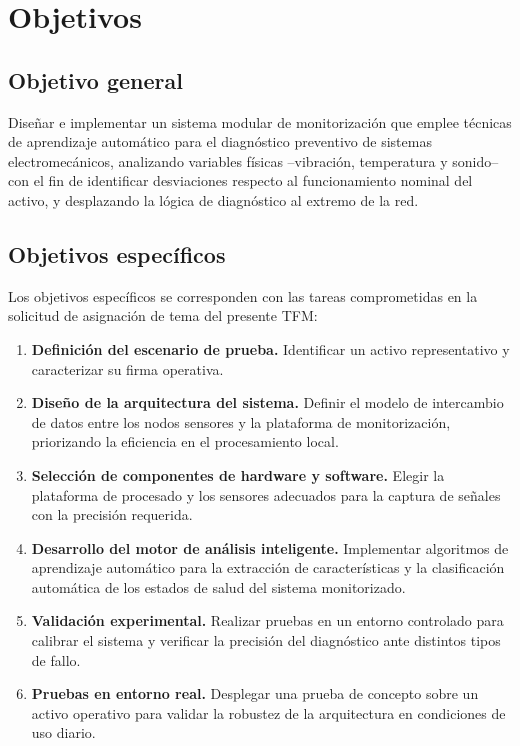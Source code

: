 \chapter{Objetivos}
\label{cap:objetivos}

\section{Objetivo general}

Diseñar e implementar un sistema modular de monitorización que emplee técnicas de
aprendizaje automático para el diagnóstico preventivo de sistemas electromecánicos,
analizando variables físicas --vibración, temperatura y sonido-- con el fin de identificar
desviaciones respecto al funcionamiento nominal del activo, y desplazando la lógica de
diagnóstico al extremo de la red.

\section{Objetivos específicos}

Los objetivos específicos se corresponden con las tareas comprometidas en la solicitud de
asignación de tema del presente TFM:

\begin{enumerate}
    \item \textbf{Definición del escenario de prueba.} Identificar un activo
        representativo y caracterizar su firma operativa.
    \item \textbf{Diseño de la arquitectura del sistema.} Definir el modelo de intercambio
        de datos entre los nodos sensores y la plataforma de monitorización, priorizando la
        eficiencia en el procesamiento local.
    \item \textbf{Selección de componentes de hardware y software.} Elegir la plataforma de
        procesado y los sensores adecuados para la captura de señales con la precisión
        requerida.
    \item \textbf{Desarrollo del motor de análisis inteligente.} Implementar algoritmos de
        aprendizaje automático para la extracción de características y la clasificación
        automática de los estados de salud del sistema monitorizado.
    \item \textbf{Validación experimental.} Realizar pruebas en un entorno controlado para
        calibrar el sistema y verificar la precisión del diagnóstico ante distintos tipos
        de fallo.
    \item \textbf{Pruebas en entorno real.} Desplegar una prueba de concepto sobre un
        activo operativo para validar la robustez de la arquitectura en condiciones de uso
        diario.
\end{enumerate}

